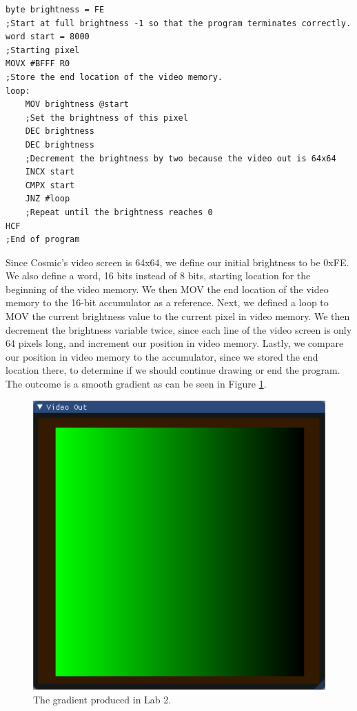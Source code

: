 \documentclass[conference]{IEEEtran}
\begin{document}
\begin{lstlisting}[caption={Cosmic assembly to output a gradient to the video screen.}, label = {lab2}]
byte brightness = FE
;Start at full brightness -1 so that the program terminates correctly.
word start = 8000
;Starting pixel
MOVX #BFFF R0
;Store the end location of the video memory.
loop:
	MOV brightness @start
	;Set the brightness of this pixel
	DEC brightness
    DEC brightness
    ;Decrement the brightness by two because the video out is 64x64
	INCX start
	CMPX start
	JNZ #loop
	;Repeat until the brightness reaches 0
HCF
;End of program
\end{lstlisting}

Since Cosmic's video screen is 64x64, we define our initial brightness to be 0xFE. We also define a word, 16 bits instead of 8 bits, starting location for the beginning of the video memory. We then MOV the end location of the video memory to the 16-bit accumulator as a reference. Next, we defined a loop to MOV the current brightness value to the current pixel in video memory. We then decrement the brightness variable twice, since each line of the video screen is only 64 pixels long, and increment our position in video memory. Lastly, we compare our position in video memory to the accumulator, since we stored the end location there, to determine if we should continue drawing or end the program. The outcome is a smooth gradient as can be seen in Figure \ref{fig:gradient}.

\begin{figure}[h!]
	\includegraphics[width=\linewidth]{lab_2_solution}
	\caption{The gradient produced in Lab 2.}
	\label{fig:gradient}
\end{figure}
\end{document}
